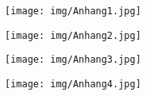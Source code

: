 \begin{figure*}
    \centering
    \texttt{[image: img/Anhang1.jpg]}
\end{figure*}
\begin{figure*}
    \centering
    \texttt{[image: img/Anhang2.jpg]}
\end{figure*}
\begin{figure*}
    \centering
    \texttt{[image: img/Anhang3.jpg]}
\end{figure*}
\begin{figure*}
    \centering
    \texttt{[image: img/Anhang4.jpg]}
\end{figure*}